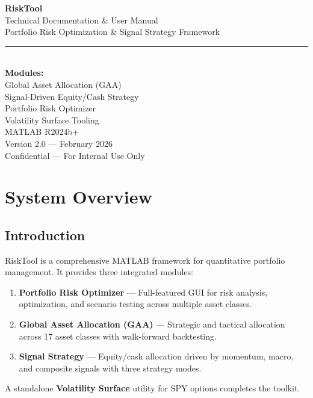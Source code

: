 \documentclass[11pt,a4paper]{article}
\begin{document}
\begin{titlepage}
\centering
\vspace*{2cm}
{\Huge\bfseries\color{sectionblue} RiskTool}\\[0.5cm]
{\LARGE\color{sectionblue!70} Technical Documentation \& User Manual}\\[2cm]
{\Large Portfolio Risk Optimization \& Signal Strategy Framework}\\[1cm]
\rule{\textwidth}{1pt}\\[1.5cm]
{\large\textbf{Modules:}}\\[0.3cm]
{\large Global Asset Allocation (GAA)}\\[0.2cm]
{\large Signal-Driven Equity/Cash Strategy}\\[0.2cm]
{\large Portfolio Risk Optimizer}\\[0.2cm]
{\large Volatility Surface Tooling}\\[2cm]
\vfill
{\large MATLAB R2024b+}\\[0.3cm]
{\large Version 2.0 --- February 2026}\\[0.5cm]
{\small Confidential --- For Internal Use Only}
\end{titlepage}

\tableofcontents
\newpage
\section{System Overview}

\subsection{Introduction}
RiskTool is a comprehensive MATLAB framework for quantitative portfolio management. It provides three integrated modules:
\begin{enumerate}[leftmargin=2em]
  \item \textbf{Portfolio Risk Optimizer} --- Full-featured GUI for risk analysis, optimization, and scenario testing across multiple asset classes.
  \item \textbf{Global Asset Allocation (GAA)} --- Strategic and tactical allocation across 17 asset classes with walk-forward backtesting.
  \item \textbf{Signal Strategy} --- Equity/cash allocation driven by momentum, macro, and composite signals with three strategy modes.
\end{enumerate}
A standalone \textbf{Volatility Surface} utility for SPY options completes the toolkit.
\end{document}
